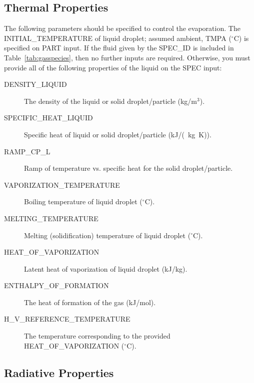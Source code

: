 \documentclass[11pt]{book}
\begin{document}
\subsection{Thermal Properties}
\label{thermal_part_props}

The following parameters should be specified to control the evaporation.  The {\ct INITIAL\_TEMPERATURE} of liquid droplet; assumed ambient, {\ct TMPA} ($^\circ$C) is specified on {\ct PART} input.  If the fluid given by the {\ct SPEC\_ID} is included in Table~\ref{tab:gasspecies},
then no further inputs are required. Otherwise, you must provide all of the following properties of the liquid on the {\ct SPEC} input:
\begin{description}
\item[{\ct DENSITY\_LIQUID}] The density of the liquid or solid droplet/particle (kg/m$^3$).
\item[{\ct SPECIFIC\_HEAT\_LIQUID}] Specific heat of liquid or solid droplet/particle (\si{kJ/(kg.K})).
\item[{\ct RAMP\_CP\_L}] Ramp of temperature vs. specific heat for the solid droplet/particle.
\item[{\ct VAPORIZATION\_TEMPERATURE}] Boiling temperature of liquid droplet ($^\circ$C).
\item[{\ct MELTING\_TEMPERATURE}] Melting (solidification) temperature of liquid droplet ($^\circ$C).
\item[{\ct HEAT\_OF\_VAPORIZATION}] Latent heat of vaporization of liquid droplet (kJ/kg).
\item[{\ct ENTHALPY\_OF\_FORMATION}] The heat of formation of the gas (kJ/mol).
\item[{\ct H\_V\_REFERENCE\_TEMPERATURE}] The temperature corresponding to the provided {\ct HEAT\_OF\_VAPORIZATION} ($^\circ$C).
\end{description}




\subsection{Radiative Properties}
\label{radiative_part_props}
\end{document}
